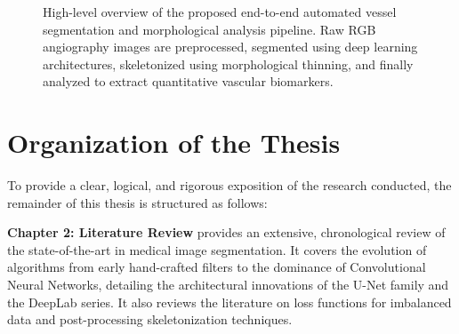 \begin{figure}[H]
    \centering
    \caption{High-level overview of the proposed end-to-end automated vessel segmentation and morphological analysis pipeline. Raw RGB angiography images are preprocessed, segmented using deep learning architectures, skeletonized using morphological thinning, and finally analyzed to extract quantitative vascular biomarkers.}
    \label{fig:pipeline_overview}
\end{figure}

\section{Organization of the Thesis}
To provide a clear, logical, and rigorous exposition of the research conducted, the remainder of this thesis is structured as follows:

\textbf{Chapter 2: Literature Review} provides an extensive, chronological review of the state-of-the-art in medical image segmentation. It covers the evolution of algorithms from early hand-crafted filters to the dominance of Convolutional Neural Networks, detailing the architectural innovations of the U-Net family and the DeepLab series. It also reviews the literature on loss functions for imbalanced data and post-processing skeletonization techniques.


